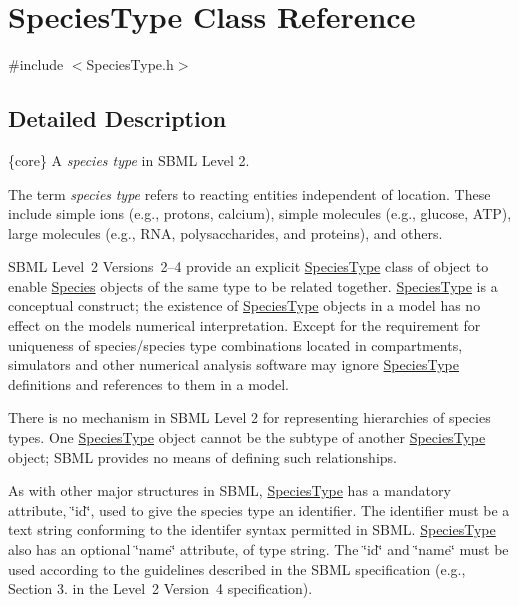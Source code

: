 \hypertarget{class_species_type}{}\section{Species\+Type Class Reference}
\label{class_species_type}


{\ttfamily \#include $<$Species\+Type.\+h$>$}



\subsection{Detailed Description}
\{core\} A {\itshape species type} in S\+B\+ML Level 2.

The term {\itshape species} {\itshape type} refers to reacting entities independent of location. These include simple ions (e.\+g., protons, calcium), simple molecules (e.\+g., glucose, A\+TP), large molecules (e.\+g., R\+NA, polysaccharides, and proteins), and others.

S\+B\+ML Level~2 Versions~2--4 provide an explicit \hyperlink{class_species_type}{Species\+Type} class of object to enable \hyperlink{class_species}{Species} objects of the same type to be related together. \hyperlink{class_species_type}{Species\+Type} is a conceptual construct; the existence of \hyperlink{class_species_type}{Species\+Type} objects in a model has no effect on the model\textquotesingle{}s numerical interpretation. Except for the requirement for uniqueness of species/species type combinations located in compartments, simulators and other numerical analysis software may ignore \hyperlink{class_species_type}{Species\+Type} definitions and references to them in a model.

There is no mechanism in S\+B\+ML Level 2 for representing hierarchies of species types. One \hyperlink{class_species_type}{Species\+Type} object cannot be the subtype of another \hyperlink{class_species_type}{Species\+Type} object; S\+B\+ML provides no means of defining such relationships.

As with other major structures in S\+B\+ML, \hyperlink{class_species_type}{Species\+Type} has a mandatory attribute, \char`\"{}id\char`\"{}, used to give the species type an identifier. The identifier must be a text string conforming to the identifer syntax permitted in S\+B\+ML. \hyperlink{class_species_type}{Species\+Type} also has an optional \char`\"{}name\char`\"{} attribute, of type {\ttfamily string}. The \char`\"{}id\char`\"{} and \char`\"{}name\char`\"{} must be used according to the guidelines described in the S\+B\+ML specification (e.\+g., Section 3. in the Level~2 Version~4 specification).


